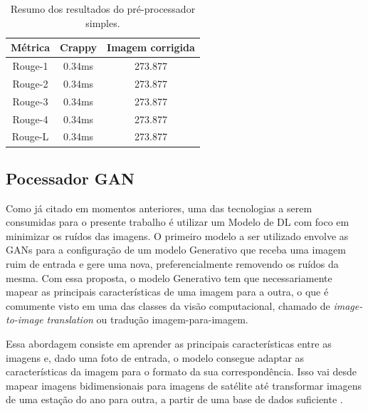 \begin{table}[H]
  \centering
  \caption{Resumo dos resultados do pré-processador simples.}
  \begin{tabular}{|c|c|c|}
    \hline
      \textbf{Métrica}  &
      \textbf{Crappy}  &
      \textbf{Imagem corrigida} \\
    \hline
      Rouge-1  &
      0.34ms &
      273.877 \\
    \hline
      Rouge-2  &
      0.34ms &
      273.877 \\
    \hline
      Rouge-3  &
      0.34ms &
      273.877 \\
    \hline
      Rouge-4  &
      0.34ms &
      273.877 \\
    \hline
      Rouge-L &
      0.34ms &
      273.877 \\
    \hline
  \end{tabular}
  \label{tab:pre-processor-result}
\end{table}

\subsection{Pocessador GAN} \label{ssec:processor-gan}

Como já citado em momentos anteriores, uma das tecnologias a serem consumidas para o presente trabalho é utilizar um Modelo de DL com foco em minimizar os ruídos das imagens. O primeiro modelo a ser utilizado envolve as GANs \cite{generative-adversarial-networks} para a configuração de um modelo Generativo que receba uma imagem ruim de entrada e gere uma nova, preferencialmente removendo os ruídos da mesma. Com essa proposta, o modelo Generativo tem que necessariamente mapear as principais características de uma imagem para a outra, o que é comumente visto em uma das classes da visão computacional, chamado de \textit{image-to-image translation} \cite{image-to-image-can} ou tradução imagem-para-imagem.

Essa abordagem consiste em aprender as principais características entre as imagens e, dado uma foto de entrada, o modelo consegue adaptar as características da imagem para o formato da sua correspondência. Isso vai desde mapear imagens bidimensionais para imagens de satélite até transformar imagens de uma estação do ano para outra, a partir de uma base de dados suficiente \cite{image-to-image-can}.

